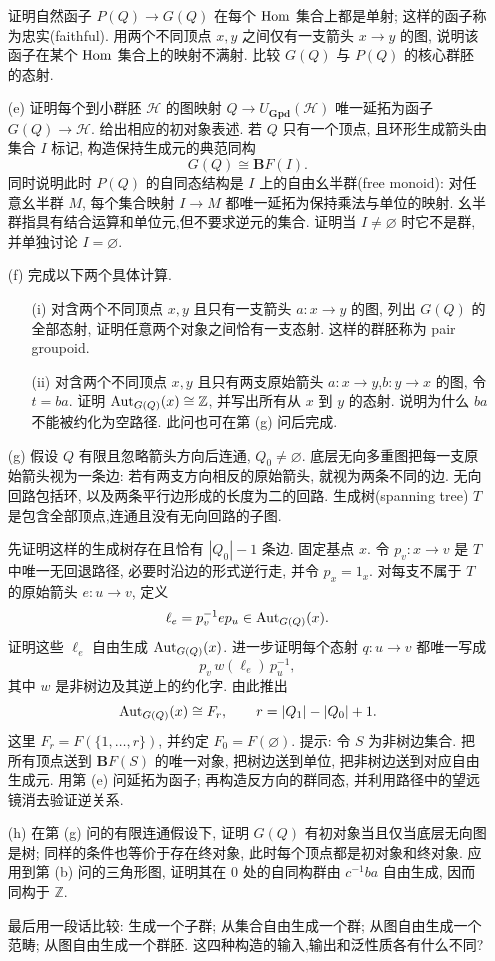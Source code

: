 \documentclass{article}
\begin{document}
\begin{problem}
\begin{enumerate}
      证明自然函子 $P(Q)\to G(Q)$ 在每个 $\Hom$ 集合上都是单射; 这样的函子称为忠实(faithful). 用两个不同顶点 $x,y$ 之间仅有一支箭头 $x\to y$ 的图, 说明该函子在某个 $\Hom$ 集合上的映射不满射. 比较 $G(Q)$ 与 $P(Q)$ 的核心群胚的态射.
    \item[(e)] 证明每个到小群胚 $\mathcal H$ 的图映射 $Q\to U_{\mathbf{Gpd}}(\mathcal H)$ 唯一延拓为函子 $G(Q)\to\mathcal H$. 给出相应的初对象表述. 若 $Q$ 只有一个顶点, 且环形生成箭头由集合 $I$ 标记, 构造保持生成元的典范同构
      \[
        G(Q)\cong\mathbf{B}F(I).
      \]
      同时说明此时 $P(Q)$ 的自同态结构是 $I$ 上的自由幺半群(free monoid): 对任意幺半群 $M$, 每个集合映射 $I\to M$ 都唯一延拓为保持乘法与单位的映射. 幺半群指具有结合运算和单位元,但不要求逆元的集合. 证明当 $I\neq\varnothing$ 时它不是群, 并单独讨论 $I=\varnothing$.
    \item[(f)] 完成以下两个具体计算.
      \begin{enumerate}
        \item[(i)] 对含两个不同顶点 $x,y$ 且只有一支箭头 $a:x\to y$ 的图, 列出 $G(Q)$ 的全部态射, 证明任意两个对象之间恰有一支态射. 这样的群胚称为 pair groupoid.
        \item[(ii)] 对含两个不同顶点 $x,y$ 且只有两支原始箭头 $a:x\to y$,$b:y\to x$ 的图, 令 $t=ba$. 证明 $\operatorname{Aut}_{G(Q)}(x)\cong\mathbb Z$, 并写出所有从 $x$ 到 $y$ 的态射. 说明为什么 $ba$ 不能被约化为空路径. 此问也可在第 (g) 问后完成.
      \end{enumerate}
    \item[(g)] 假设 $Q$ 有限且忽略箭头方向后连通, $Q_0\neq\varnothing$. 底层无向多重图把每一支原始箭头视为一条边: 若有两支方向相反的原始箭头, 就视为两条不同的边. 无向回路包括环, 以及两条平行边形成的长度为二的回路. 生成树(spanning tree) $T$ 是包含全部顶点,连通且没有无向回路的子图.

      先证明这样的生成树存在且恰有 $|Q_0|-1$ 条边. 固定基点 $x$. 令 $p_v:x\to v$ 是 $T$ 中唯一无回退路径, 必要时沿边的形式逆行走, 并令 $p_x=1_x$. 对每支不属于 $T$ 的原始箭头 $e:u\to v$, 定义
      \[
        \ell_e=p_v^{-1}ep_u\in\operatorname{Aut}_{G(Q)}(x).
      \]
      证明这些 $\ell_e$ 自由生成 $\operatorname{Aut}_{G(Q)}(x)$. 进一步证明每个态射 $q:u\to v$ 都唯一写成
      \[
        p_v\,w(\ell_e)\,p_u^{-1},
      \]
      其中 $w$ 是非树边及其逆上的约化字. 由此推出
      \[
        \operatorname{Aut}_{G(Q)}(x)\cong F_r,\qquad r=|Q_1|-|Q_0|+1.
      \]
      这里 $F_r=F(\{1,\ldots,r\})$, 并约定 $F_0=F(\varnothing)$. 提示: 令 $S$ 为非树边集合. 把所有顶点送到 $\mathbf{B}F(S)$ 的唯一对象, 把树边送到单位, 把非树边送到对应自由生成元. 用第 (e) 问延拓为函子; 再构造反方向的群同态, 并利用路径中的望远镜消去验证逆关系.
    \item[(h)] 在第 (g) 问的有限连通假设下, 证明 $G(Q)$ 有初对象当且仅当底层无向图是树; 同样的条件也等价于存在终对象, 此时每个顶点都是初对象和终对象. 应用到第 (b) 问的三角形图, 证明其在 $0$ 处的自同构群由 $c^{-1}ba$ 自由生成, 因而同构于 $\mathbb Z$.

      最后用一段话比较: 生成一个子群; 从集合自由生成一个群; 从图自由生成一个范畴; 从图自由生成一个群胚. 这四种构造的输入,输出和泛性质各有什么不同?
  \end{enumerate}
\end{problem}
\end{document}
